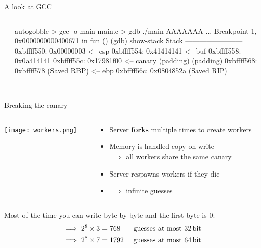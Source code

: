 \documentclass[beamer]{uibk}
\begin{document}
\begin{frame}[fragile]{A look at GCC}
    \begin{columns}
        \begin{column}{0.5\textwidth}
        \end{column}
        \pause
        \begin{column}{0.5\textwidth}
            \begin{pre*}{autogobble}
                > gcc -o main main.c
                > gdb ./main
                AAAAAAA
                  ...
                Breakpoint 1, 0x0000000000400671 in fun ()
                (gdb) show-stack
                Stack
                ------------------------
                0xbffff550: 0x00000003             <-- esp
                0xbffff554: 0x41414141             <-- buf
                0xbffff558: 0x0a414141
                0xbffff55c: 0x17981f00             <-- canary
                       (padding)
                       (padding)
                0xbffff568: 0xbffff578 (Saved RBP) <-- ebp
                0xbffff56c: 0x0804852a (Saved RIP)
                ------------------------
            \end{pre*}
        \end{column}
    \end{columns}
\end{frame}

\begin{frame}{Breaking the canary}
    \begin{columns}
        \begin{column}{0.4\textwidth}
            \begin{center}
                \texttt{[image: workers.png]}
            \end{center}
        \end{column}
        \pause
        \begin{column}{0.6\textwidth}
            \begin{itemize}
                \item Server \textbf{forks} multiple times to create workers
                \item Memory is handled copy-on-write\\
                    $\implies$ all workers share the same canary
                \item Server respawns workers if they die
                \item $\implies$ infinite guesses
            \end{itemize}
        \end{column}
    \end{columns}
    \bigskip
    \pause
    Most of the time you can write byte by byte and the first byte is $0$:
    \begin{align*}
        \implies 2^8 \times 3 & = 768  & \text{ guesses at most \SI{32}{\bit}}\\
        \implies 2^8 \times 7 & = 1792 & \text{ guesses at most \SI{64}{\bit}}
    \end{align*}
\end{frame}
\end{document}
